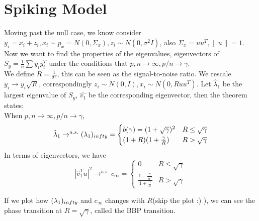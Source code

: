 \documentclass[12pt]{article}
\theoremstyle{plain}
\begin{document}
\section*{Spiking Model}
Moving past the null case, we know consider $y_i = x_i + z_i, x_i \sim p_x=N(0, \Sigma_x), z_i \sim N(0,\sigma^2 I)$, also $\Sigma_x = uu^T, \|u\|=1$. Now we want to find the properties of the eigenvalues, eigenvectors of $S_y = \frac{1}{n}\sum y_i y_i^T$ under the conditions that $p,n \rightarrow \infty, p/n \rightarrow \gamma$. \\
We define $R = \frac{1}{\sigma^2}$, this can be seen as the signal-to-noise ratio. We rescale $y_i \rightarrow y_i\sqrt{R}$, correspondingly $z_i \sim N(0,I), x_i \sim N(0, R uu^T)$. Let $\hat{\lambda}_1$ be the largest eigenvalue of $S_y$, $\hat{v_1}$ be the corresponding eigenvector, then the theorem states:\\
When  $p,n \rightarrow \infty, p/n \rightarrow \gamma$, 
$$\hat{\lambda}_1 \rightarrow^{a.s.} (\lambda_1)_{\\infty} = 
\begin{cases}
  b(\gamma) = (1+\sqrt{\gamma})^2 & R \leq \sqrt{\gamma}\\
  (1+R)(1+\frac{\gamma}{R}) & R>\sqrt{\gamma}
\end{cases}$$
In terms of eigenvectors, we have 
$$|\hat{v}_1^Tu|^2 \rightarrow^{a.s.} c_{\infty} = 
\begin{cases}
  0 & R \leq \sqrt{\gamma}\\
  \frac{1-\frac{\gamma}{R^2}}{1+\frac{\gamma}{R}}  & R>\sqrt{\gamma}
\end{cases}$$

If we plot how $ (\lambda_1)_{\\infty}$ and $c_{\infty}$ changes with $R$(skip the plot :) ), we can see the phase transition at $R=\sqrt{\gamma}$, called the  BBP transition.
\end{document}

